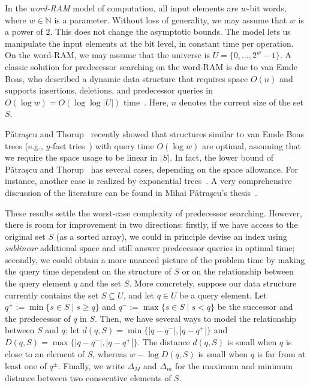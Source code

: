 \documentclass[a4paper,11pt]{article}
\newcommand{\N}{\mathbb{N}}
\newcommand{\?}{\mskip1.5mu}
\newcommand{\Patrascu}{P\v{a}tra\c{s}cu\xspace}
\begin{document}
In the \emph{word-RAM} model of computation, all input 
elements are $w$-bit words, where $w \in \N$ is a
parameter. Without loss of generality, we may assume 
that $w$ is a power of $2$. This does not change the
asymptotic bounds. The model lets us manipulate the 
input elements at the bit level, in constant time per 
operation. On the word-RAM, we may assume that the 
universe is $U = \{0, \dots, 2^{w}-1\}$. A classic 
solution for predecessor searching on the word-RAM is 
due to van Emde Boas, who described a dynamic data 
structure that requires space $O(n)$ and supports 
insertions, deletions, and predecessor queries in 
$O(\log w) = O(\log\log |U|)$ 
time~\cite{vEmdeBoas77,vEmdeBoasKaZi76,CormenLeRiSt09}.
Here, $n$ denotes the current size of the set $S$.


\Patrascu and Thorup~\cite{PatrascuTh06,PatrascuTh07} 
recently showed that structures similar to van Emde Boas 
trees (e.g., $y$-fast tries~\cite{Willard83}) with query
time $O(\log w)$ are optimal, assuming that we require 
the space usage to be linear in $|S|$. In fact, the lower 
bound of \Patrascu and Thorup~\cite{PatrascuTh06,PatrascuTh07} 
has several cases, depending on the space allowance. 
For instance, another case is realized by exponential 
trees~\cite{AnderssonTh07}. A very comprehensive discussion 
of the literature can be found in Mihai \Patrascu's
thesis~\cite{Patrascu08}.

These results settle the worst-case complexity 
of predecessor searching. However, there is 
room for improvement in two directions: firstly, if 
we have access to the original set $S$ (as a sorted array), 
we could in principle devise an index using 
\emph{sublinear} additional space and still answer 
predecessor queries in optimal time; secondly, we could
obtain a more nuanced picture of the problem time by 
making the query time dependent on the structure of $S$ 
or on the relationship between the query element $q$ 
and the set $S$. More concretely, suppose our data structure 
currently contains the set $S \subseteq U$, and let $q \in U$ 
be a query element.  Let $q^+ := \min\{s \in S \mid s \geq q \}$ and
$q^- := \max\{s \in S \mid s < q \}$ be the 
successor and the predecessor of $q$ in $S$.
Then, we have several ways to model the
relationship between $S$ and $q$: 
let $d(q, S) = \min\{|q - q^-|, |q - q^+|\}$ and 
$D(q, S) = \max\{|q - q^-|, |q - q^+|\}$.
The distance $d(q, S)$ is small when $q$ is close to an 
element of $S$, whereas $w - \log D(q, S)$
is small when $q$ is far from at least one of $q^\pm$.
Finally, we write $\Delta_M$ and $\Delta_m$ for the maximum 
and minimum distance between two consecutive elements of $S$.
\end{document}
